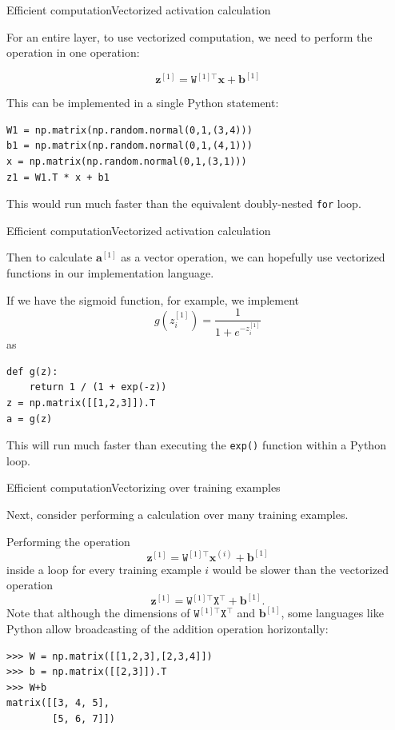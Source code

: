 \documentclass{beamer}
\renewcommand{\vec}[1]{\boldsymbol{#1}}
\newcommand{\mat}[1]{\mathtt{#1}}
\begin{document}
  
\begin{frame}[fragile]{Efficient computation}{Vectorized activation calculation}

  For an entire layer, to use vectorized computation, we need to perform
  the operation in one operation:

  \[ \vec{z}^{[1]} = \mat{W}^{[1]\top} \vec{x} + \vec{b}^{[1]} \]

  This can be implemented in a single Python statement:

\begin{verbatim}
W1 = np.matrix(np.random.normal(0,1,(3,4)))
b1 = np.matrix(np.random.normal(0,1,(4,1)))
x = np.matrix(np.random.normal(0,1,(3,1)))
z1 = W1.T * x + b1
\end{verbatim}

  This would run much faster than the equivalent doubly-nested
  \texttt{for} loop.

\end{frame}

  
\begin{frame}[fragile]{Efficient computation}{Vectorized activation calculation}

  Then to calculate $\vec{a}^{[1]}$ as a vector operation, we can
  hopefully use vectorized functions in our implementation language.

  \medskip

  If we have the sigmoid function, for example, we implement
  \[ g(z_i^{[1]}) = \frac{1}{1+e^{-z_i^{[1]}}} \]
  as
  \begin{verbatim}
def g(z):
    return 1 / (1 + exp(-z))
z = np.matrix([[1,2,3]]).T
a = g(z)
  \end{verbatim}

  This will run much faster than executing the \texttt{exp()} function
  within a Python loop.
  
\end{frame}

  
\begin{frame}[fragile]{Efficient computation}{Vectorizing over training examples}

  Next, consider performing a calculation over \alert{many training examples}.

  \medskip

  Performing the operation
  \[ \vec{z}^{[1]} = \mat{W}^{[1]\top} \vec{x}^{(i)} + \vec{b}^{[1]} \]
  inside a loop for every training example $i$ would be slower than the
  vectorized operation
  \[ \vec{z}^{[1]} = \mat{W}^{[1]\top} \mat{X}^\top + \vec{b}^{[1]}. \]
  Note that although the dimensions of
  $\mat{W}^{[1]\top} \mat{X}^\top$ and $\vec{b}^{[1]}$,
  some languages like Python allow \alert{broadcasting} of the addition
  operation horizontally:
  \begin{verbatim}
>>> W = np.matrix([[1,2,3],[2,3,4]])
>>> b = np.matrix([[2,3]]).T
>>> W+b
matrix([[3, 4, 5],
        [5, 6, 7]])
\end{verbatim}  

\end{frame}
\end{document}
